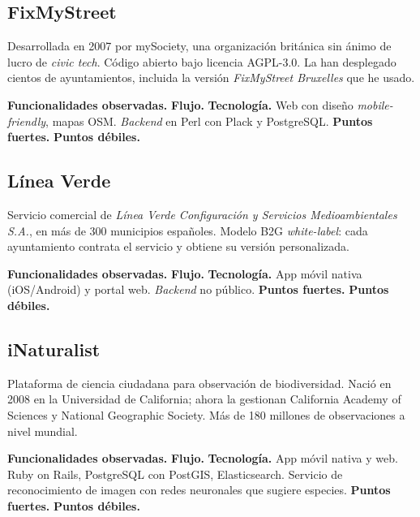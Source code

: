 \subsection{FixMyStreet}
\label{subsec:fixmystreet}

Desarrollada en 2007 por mySociety, una organización británica sin ánimo de lucro de \textit{civic tech}. Código abierto bajo licencia AGPL-3.0. La han desplegado cientos de ayuntamientos, incluida la versión \textit{FixMyStreet Bruxelles} que he usado.


\textbf{Funcionalidades observadas.}  %
\textbf{Flujo.}  %
\textbf{Tecnología.}  Web con diseño \textit{mobile-friendly}, mapas OSM. \textit{Backend} en Perl con Plack y PostgreSQL.
\textbf{Puntos fuertes.}  %
\textbf{Puntos débiles.}  %


\subsection{Línea Verde}
\label{subsec:linea-verde}

Servicio comercial de \textit{Línea Verde Configuración y Servicios Medioambientales S.A.}, en más de 300 municipios españoles. Modelo B2G \textit{white-label}: cada ayuntamiento contrata el servicio y obtiene su versión personalizada.

\textbf{Funcionalidades observadas.}
\textbf{Flujo.}
\textbf{Tecnología.}  App móvil nativa (iOS/Android) y portal web. \textit{Backend} no público.
\textbf{Puntos fuertes.}
\textbf{Puntos débiles.}


\subsection{iNaturalist}
\label{subsec:inaturalist}

Plataforma de ciencia ciudadana para observación de biodiversidad. Nació en 2008 en la Universidad de California; ahora la gestionan California Academy of Sciences y National Geographic Society. Más de 180 millones de observaciones a nivel mundial.

\textbf{Funcionalidades observadas.}
\textbf{Flujo.}
\textbf{Tecnología.}  App móvil nativa y web. Ruby on Rails, PostgreSQL con PostGIS, Elasticsearch. Servicio de reconocimiento de imagen con redes neuronales que sugiere especies.
\textbf{Puntos fuertes.}
\textbf{Puntos débiles.}


